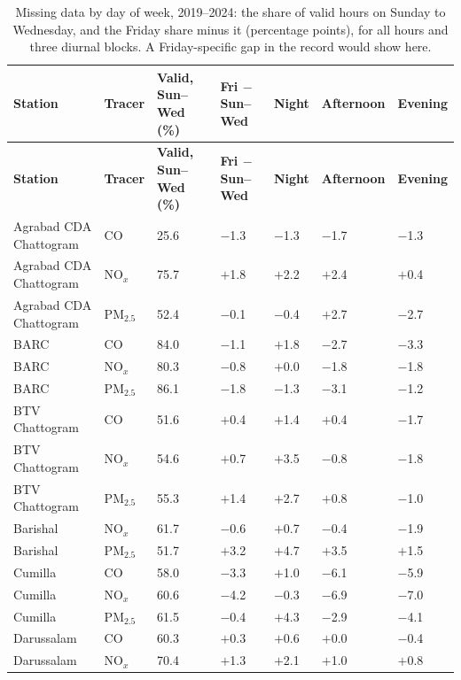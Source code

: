 \begingroup\footnotesize
\begin{longtable}{L{3.2cm} L{1.2cm} C{1.6cm} C{1.6cm} C{1.6cm} C{1.6cm} C{1.6cm}}
\caption{Missing data by day of week, 2019--2024: the share of valid hours on Sunday to Wednesday, and the Friday share minus it (percentage points), for all hours and three diurnal blocks. A Friday-specific gap in the record would show here.}\label{tab:s-missing}\\
\toprule
\textbf{Station} & \textbf{Tracer} & \textbf{Valid, Sun--Wed (\%)} & \textbf{Fri $-$ Sun--Wed} & \textbf{Night} & \textbf{Afternoon} & \textbf{Evening} \\
\midrule\endfirsthead
\toprule
\textbf{Station} & \textbf{Tracer} & \textbf{Valid, Sun--Wed (\%)} & \textbf{Fri $-$ Sun--Wed} & \textbf{Night} & \textbf{Afternoon} & \textbf{Evening} \\
\midrule\endhead
\bottomrule\endfoot
Agrabad CDA Chattogram & CO & 25.6 & $-$1.3 & $-$1.3 & $-$1.7 & $-$1.3 \\
Agrabad CDA Chattogram & NO$_x$ & 75.7 & $+$1.8 & $+$2.2 & $+$2.4 & $+$0.4 \\
Agrabad CDA Chattogram & PM$_{2.5}$ & 52.4 & $-$0.1 & $-$0.4 & $+$2.7 & $-$2.7 \\
BARC & CO & 84.0 & $-$1.1 & $+$1.8 & $-$2.7 & $-$3.3 \\
BARC & NO$_x$ & 80.3 & $-$0.8 & $+$0.0 & $-$1.8 & $-$1.8 \\
BARC & PM$_{2.5}$ & 86.1 & $-$1.8 & $-$1.3 & $-$3.1 & $-$1.2 \\
BTV Chattogram & CO & 51.6 & $+$0.4 & $+$1.4 & $+$0.4 & $-$1.7 \\
BTV Chattogram & NO$_x$ & 54.6 & $+$0.7 & $+$3.5 & $-$0.8 & $-$1.8 \\
BTV Chattogram & PM$_{2.5}$ & 55.3 & $+$1.4 & $+$2.7 & $+$0.8 & $-$1.0 \\
Barishal & NO$_x$ & 61.7 & $-$0.6 & $+$0.7 & $-$0.4 & $-$1.9 \\
Barishal & PM$_{2.5}$ & 51.7 & $+$3.2 & $+$4.7 & $+$3.5 & $+$1.5 \\
Cumilla & CO & 58.0 & $-$3.3 & $+$1.0 & $-$6.1 & $-$5.9 \\
Cumilla & NO$_x$ & 60.6 & $-$4.2 & $-$0.3 & $-$6.9 & $-$7.0 \\
Cumilla & PM$_{2.5}$ & 61.5 & $-$0.4 & $+$4.3 & $-$2.9 & $-$4.1 \\
Darussalam & CO & 60.3 & $+$0.3 & $+$0.6 & $+$0.0 & $-$0.4 \\
Darussalam & NO$_x$ & 70.4 & $+$1.3 & $+$2.1 & $+$1.0 & $+$0.8 \\

\end{longtable}
